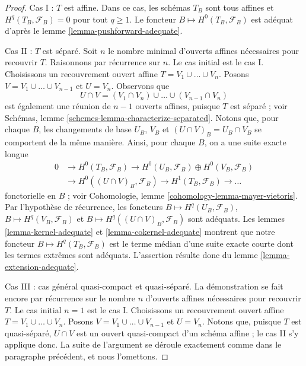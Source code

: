 \begin{proof}
\medskip\noindent
Cas I : $T$ est affine. Dans ce cas, les schémas $T_B$ sont tous affines
et $H^q(T_B, \mathcal{F}_B) = 0$ pour tout $q \geq 1$.
Le foncteur $B \mapsto H^0(T_B, \mathcal{F}_B)$ est adéquat d'après le
lemme \ref{lemma-pushforward-adequate}.

\medskip\noindent
Cas II : $T$ est séparé. Soit $n$ le nombre minimal d'ouverts affines nécessaires
pour recouvrir $T$. Raisonnons par récurrence sur $n$. Le cas initial est le cas I.
Choisissons un recouvrement ouvert affine $T = V_1 \cup \ldots \cup V_n$.
Posons $V = V_1 \cup \ldots \cup V_{n - 1}$ et $U = V_n$. Observons que
$$
U \cap V = (V_1 \cap V_n) \cup \ldots \cup (V_{n - 1} \cap V_n)
$$
est également une réunion de $n - 1$ ouverts affines, puisque $T$ est séparé ; voir
Schémas, lemme \ref{schemes-lemma-characterize-separated}.
Notons que, pour chaque $B$, les changements de base $U_B$, $V_B$ et
$(U \cap V)_B = U_B \cap V_B$ se comportent de la même manière. Ainsi,
pour chaque $B$, on a une suite exacte longue
$$
\begin{aligned}
0 &\to H^0(T_B, \mathcal{F}_B) \to
H^0(U_B, \mathcal{F}_B) \oplus H^0(V_B, \mathcal{F}_B) \\
&\to H^0((U \cap V)_B, \mathcal{F}_B) \to
H^1(T_B, \mathcal{F}_B) \to \ldots
\end{aligned}
$$
fonctorielle en $B$ ; voir
Cohomologie, lemme \ref{cohomology-lemma-mayer-vietoris}.
Par l'hypothèse de récurrence, les foncteurs
$B \mapsto H^q(U_B, \mathcal{F}_B)$,
$B \mapsto H^q(V_B, \mathcal{F}_B)$ et
$B \mapsto H^q((U \cap V)_B, \mathcal{F}_B)$
sont adéquats. Les
lemmes \ref{lemma-kernel-adequate} et
\ref{lemma-cokernel-adequate}
montrent que notre foncteur $B \mapsto H^q(T_B, \mathcal{F}_B)$ est le
terme médian d'une suite exacte courte dont les termes extrêmes sont adéquats.
L'assertion résulte donc du
lemme \ref{lemma-extension-adequate}.

\medskip\noindent
Cas III : cas général quasi-compact et quasi-séparé.
La démonstration se fait encore par récurrence sur le nombre $n$ d'ouverts affines
nécessaires pour recouvrir $T$. Le cas initial $n = 1$ est le cas I.
Choisissons un recouvrement ouvert affine $T = V_1 \cup \ldots \cup V_n$.
Posons $V = V_1 \cup \ldots \cup V_{n - 1}$ et $U = V_n$. Notons que,
puisque $T$ est quasi-séparé, $U \cap V$ est un ouvert quasi-compact d'un
schéma affine ; le cas II s'y applique donc. La suite de l'argument
se déroule exactement comme dans le paragraphe précédent, et nous
l'omettons.
\end{proof}







